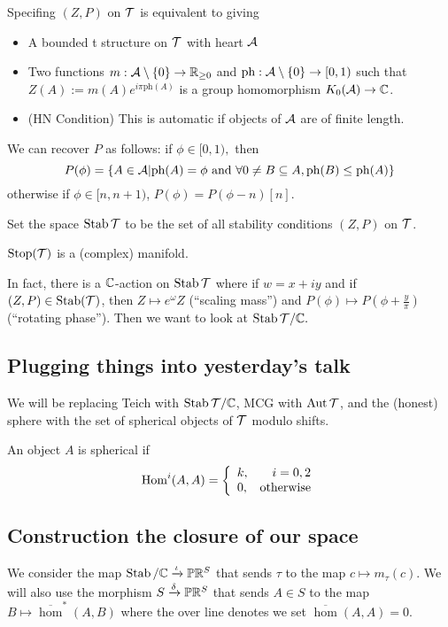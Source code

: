 \documentclass[12pt]{article}
\begin{document}
\begin{prop}[Bridgeland]
	Specifing $(Z,P)$ on $\mathcal{T}$ is equivalent to giving 
	\begin{itemize}
		\item A bounded t structure on $\mathcal{T}$ with heart $\mathcal{A}$
		\item Two functions $m:\mathcal{A}\setminus\{0\}\to \mathbb{R}_{\ge 0}$ and $\text{ph}:\mathcal{A}\setminus\{0\}\to [0,1)$
		such that $Z(A):= m(A)e^{i\pi\text{ph}(A)}$ is a group homomorphism $K_0(\mathcal{A})\to\mathbb{C}$.
		\item (HN Condition) This is automatic if objects of $\mathcal{A}$ are of finite length.
	\end{itemize}
\end{prop}
\begin{rmk}
	We can recover $P$ as follows: if $\phi\in[0,1),$ then 
	\[P(\phi)=\{A\in\mathcal{A}|\text{ph}(A)=\phi\text{ and } \forall 0\ne B\subseteq A, \text{ph}(B)\le\text{ph}(A)\}\]
	otherwise if $\phi\in[n,n+1)$, $P(\phi)=P(\phi-n)[n].$
\end{rmk}

Set the space $\operatorname{Stab}\mathcal{T}$ to be the set of all stability conditions $(Z,P)$ on $\mathcal{T}$.
\begin{thm}[Bridgeland]
	$\operatorname{Stop}(\mathcal{T})$ is a (complex) manifold.
\end{thm}
In fact, there is a $\mathbb{C}$-action on $\operatorname{Stab}\mathcal{T}$ where if $w=x+iy$ and if $(Z,P)\in\operatorname{Stab}(\mathcal{T})$,
then $Z\mapsto e^\omega Z$ (``scaling mass'') and $P(\phi)\mapsto P(\phi+\frac{y}{\pi})$ (``rotating phase''). Then we want to look at $\operatorname{Stab}\mathcal{T}/\mathbb{C}.$

\subsection{Plugging things into yesterday's talk}
We will be replacing Teich with $\operatorname{Stab}\mathcal{T}/\mathbb{C}$, MCG with $\operatorname{Aut}\mathcal{T}$, and the (honest) sphere with the set of spherical objects of $\mathcal{T}$ modulo shifts.

\begin{defn}
	An object $A$ is spherical if
	\[\operatorname{Hom}^i(A,A)=\left\{\begin{array}{lr}
		k, & i=0,2\\
		0,& \text{otherwise}
	\end{array}\right.\]
\end{defn}

\subsection{Construction the closure of our space}
We consider the map $\operatorname{Stab}/\mathbb{C}\xrightarrow{\iota} \mathbb{P}\mathbb{R}^S$ that sends $\tau$ to the map $c\mapsto m_\tau(c)$. We will also use the morphism 
$S\xrightarrow{\delta} \mathbb{P}\mathbb{R}^S$ that sends $A\in S$ to the map $B\mapsto \overline\hom^\ast(A,B)$ where the over line denotes we set $\overline\hom(A,A)=0$.
\end{document}
